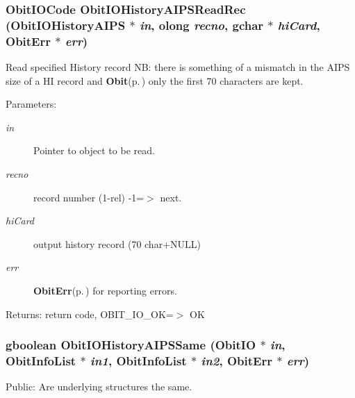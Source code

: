 \subsubsection{\setlength{\rightskip}{0pt plus 5cm}Obit\-IOCode Obit\-IOHistory\-AIPSRead\-Rec ({\bf Obit\-IOHistory\-AIPS} $\ast$ {\em in}, {\bf olong} {\em recno}, gchar $\ast$ {\em hi\-Card}, {\bf Obit\-Err} $\ast$ {\em err})}\label{ObitIOHistoryAIPS_8c_a18}


Read specified History record NB: there is something of a mismatch in the AIPS size of a HI record and {\bf Obit}{\rm (p.\,\pageref{structObit})} only the first 70 characters are kept. 

\begin{Desc}
\item[Parameters:]
\begin{description}
\item[{\em in}]Pointer to object to be read. \item[{\em recno}]record number (1-rel) -1=$>$ next. \item[{\em hi\-Card}]output history record (70 char+NULL) \item[{\em err}]{\bf Obit\-Err}{\rm (p.\,\pageref{structObitErr})} for reporting errors. \end{description}
\end{Desc}
\begin{Desc}
\item[Returns:]return code, OBIT\_\-IO\_\-OK=$>$ OK \end{Desc}
\subsubsection{\setlength{\rightskip}{0pt plus 5cm}gboolean Obit\-IOHistory\-AIPSSame ({\bf Obit\-IO} $\ast$ {\em in}, {\bf Obit\-Info\-List} $\ast$ {\em in1}, {\bf Obit\-Info\-List} $\ast$ {\em in2}, {\bf Obit\-Err} $\ast$ {\em err})}\label{ObitIOHistoryAIPS_8c_a12}


Public: Are underlying structures the same. 

